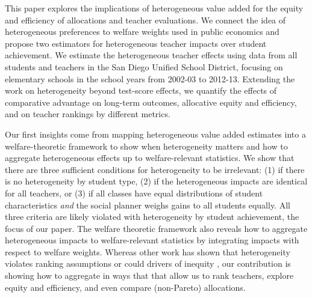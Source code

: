 \documentclass{article}
\theoremstyle{definition}
\theoremstyle{definition}
\theoremstyle{definition}
\begin{document}
This paper explores the implications of heterogeneous value added for the equity and efficiency of allocations and teacher evaluations. We connect the idea of heterogeneous preferences to welfare weights used in public economics and propose two estimators for heterogeneous teacher impacts over student achievement. We estimate the heterogeneous teacher effects using data from all students and teachers in the San Diego Unified School District, focusing on elementary schools in the school years from 2002-03 to 2012-13. Extending the work on heterogeneity beyond test-score effects, we quantify the effects of comparative advantage on long-term outcomes, allocative equity and efficiency, and on teacher rankings by different metrics.

Our first insights come from mapping heterogeneous value added estimates into a welfare-theoretic framework to show when heterogeneity matters and how to aggregate heterogeneous effects up to welfare-relevant statistics. We show that there are three sufficient conditions for heterogeneity to be irrelevant: (1) if there is no heterogeneity by student type, (2) if the heterogeneous impacts are identical for all teachers, or (3) if all classes have equal distributions of student characteristics \textit{and} the social planner weighs gains to all students equally. All three criteria are likely violated with heterogeneity by student achievement, the focus of our paper. The welfare theoretic framework also reveals how to aggregate heterogeneous impacts to welfare-relevant statistics by integrating impacts with respect to welfare weights. Whereas other work has shown that heterogeneity violates ranking assumptions \citep{condie2014teacher} or could drivers of inequity \citep{Delgado2020,bates2022teacher}, our contribution is showing how to aggregate in ways that that allow us to rank teachers, explore equity and efficiency, and even compare (non-Pareto) allocations.
\end{document}

